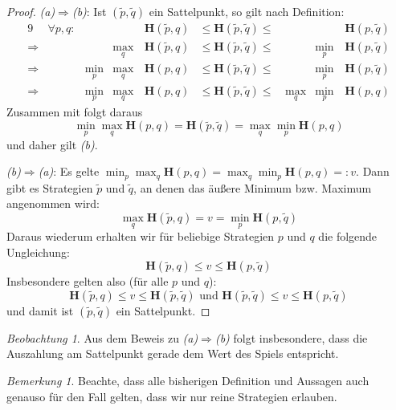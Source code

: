 \documentclass[a4paper,ngerman,12pt,bibtotoc]{scrartcl}
\theoremstyle{definition}
\theoremstyle{plain}
\theoremstyle{remark}
\newtheorem{bem}[defn]{Bemerkung}
\newtheorem{beob}[defn]{Beobachtung}
\renewcommand{\_}{\mathpunct{.}\,}
\newcommand{\?}{\,{:}\,}
\renewcommand{\sp}{\tilde{p}}		%
\newcommand{\sq}{\tilde{q}}		%
\newcommand{\EH}{\boldsymbol{H}}
\begin{document}
	\begin{proof}
		\glqq \textit{(a)$\Rightarrow$(b)}\grqq: Ist $(\sp,\sq)$ ein Sattelpunkt, so gilt nach Definition:		
		\begin{alignat*}{9}
						&\forall p,q:	&		& 		&\EH(\sp,q) &\leq \EH(\sp,\sq) \leq &		&		&\EH(p,\sq) \\
			\Rightarrow	&				&		&\max_q	&\EH(\sp,q) &\leq \EH(\sp,\sq) \leq &		&\min_p	&\EH(p,\sq) \\
			\Rightarrow	& 				&\min_p &\max_q	&\EH(p,q)	&\leq \EH(\sp,\sq) \leq &		&\min_p	&\EH(p,\sq) \\
			\Rightarrow	&				&\min_p	&\max_q\,&\EH(p,q) 	&\leq \EH(\sp,\sq) \leq\,&\max_q&\min_p\,&\EH(p,q)
		\end{alignat*}
		Zusammen mit  folgt daraus
			\[\min_p\max_q\EH(p,q) = \EH(\sp,\sq) = \max_q\min_p\EH(p,q)\]
		und daher gilt \textit{(b)}.
		
		\glqq \textit{(b)$\Rightarrow$(a)}\grqq: Es gelte $\min_p \max_q \EH(p,q) = \max_q \min_p \EH(p,q) =: v$. Dann gibt es Strategien $\sp$ und $\sq$, an denen das \glqq äußere\grqq{} Minimum bzw. Maximum angenommen wird:
			\[\max_q \EH(\sp,q) = v = \min_p \EH(p,\sq)\]
		Daraus wiederum erhalten wir für beliebige Strategien $p$ und $q$ die folgende Ungleichung:
			\[\EH(\sp,q) \leq v \leq \EH(p,\sq)\]
		Insbesondere gelten also (für alle $p$ und $q$):
			\[\EH(\sp,q) \leq v \leq \EH(\sp,\sq) \text{ und } \EH(\sp,\sq) \leq v \leq \EH(p,\sq)\]
		und damit ist $(\sp,\sq)$ ein Sattelpunkt.
	\end{proof}
	
	\begin{beob}
		Aus dem Beweis zu \glqq \textit{(a)$\Rightarrow$(b)}\grqq{} folgt insbesondere, dass die Auszahlung am Sattelpunkt gerade dem Wert des Spiels entspricht.
	\end{beob}
	
	\begin{bem}
		Beachte, dass alle bisherigen Definition und Aussagen auch genauso für den Fall gelten, dass wir nur reine Strategien erlauben. 
	\end{bem}
	
\end{document}
